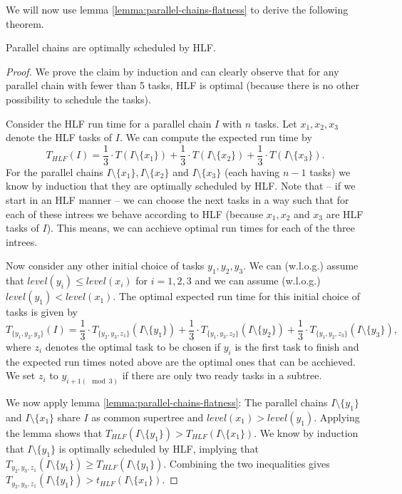 We will now use lemma \ref{lemma:parallel-chains-flatness} to derive the following theorem.

\begin{theorem}
  Parallel chains are optimally scheduled by HLF.
\end{theorem}

\begin{proof}
  \newcommand{\iminus}[1]{I\setminus\{#1\}}

  We prove the claim by induction and can clearly observe that for any parallel chain with fewer than 5 tasks, HLF is optimal (because there is no other possibility to schedule the tasks).
  
  Consider the HLF run time for a parallel chain $I$ with $n$ tasks. Let $x_1,x_2,x_3$ denote the HLF tasks of $I$. We can compute the expected run time by
  \begin{equation*}
    T_{HLF}(I) = 
    \frac{1}{3} \cdot T(\iminus{x_1}) +
    \frac{1}{3} \cdot T(\iminus{x_2}) +
    \frac{1}{3} \cdot T(\iminus{x_3})
    .
  \end{equation*}
  For the parallel chains $\iminus{x_1}, \iminus{x_2}$ and $\iminus{x_3}$ (each having $n-1$ tasks) we know by induction that they are optimally scheduled by HLF. Note that -- if we start in an HLF manner -- we can choose the next tasks in a way such that for each of these intrees we behave according to HLF (because $x_1, x_2$ and $x_3$ are HLF tasks of $I$). This means, we can acchieve optimal run times for each of the three intrees.

  Now consider any other initial choice of tasks $y_1,y_2,y_3$. We can (w.l.o.g.) assume that $level(y_i)\leq level(x_i)$ for $i=1,2,3$ and we can assume (w.l.o.g.) $level(y_1) < level(x_1)$. The optimal expected run time for this initial choice of tasks is given by
  \begin{equation*}
    T_{\{y_1,y_2,y_3\}}(I) = 
    \frac{1}{3} \cdot T_{\{y_2,y_3,z_1\}}(\iminus{y_1}) +
    \frac{1}{3} \cdot T_{\{y_1,y_3,z_2\}}(\iminus{y_2}) +
    \frac{1}{3} \cdot T_{\{y_1,y_2,z_3\}}(\iminus{y_3})
    ,
  \end{equation*}
  where $z_i$ denotes the optimal task to be chosen if $y_i$ is the first task to finish and the expected run times noted above are the optimal ones that can be acchieved. We set $z_i$ to $y_{i+1(\mod 3)}$ if there are only two ready tasks in a subtree.
  
  We now apply lemma \ref{lemma:parallel-chains-flatness}: The parallel chains $\iminus{y_1}$ and $\iminus{x_1}$ share $I$ as common supertree and $level(x_1) > level(y_1)$. Applying the lemma shows that $T_{HLF}(\iminus{y_1}) > T_{HLF}(\iminus{x_1})$. We know by induction that $\iminus{y_1}$ is optimally scheduled by HLF, implying that $T_{y_2,y_3,z_1}(\iminus{y_1}) \geq T_{HLF}(\iminus{y_1})$. Combining the two inequalities gives $T_{y_2,y_3,z_1}(\iminus{y_1}) > t_{HLF}(\iminus{x_1})$.


\end{proof}

